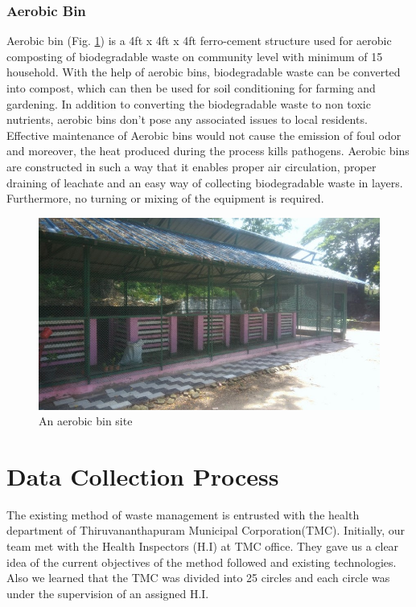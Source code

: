 \documentclass[12pt,a4paper]{report}
\begin{document}
\subsection{Aerobic Bin}
Aerobic bin (Fig. \ref{fig:aerobins}) is a 4ft x 4ft x 4ft ferro-cement structure used for aerobic composting of biodegradable waste on community level with minimum of 15 household. With the help of aerobic bins, biodegradable waste can be converted into compost, which can then be used for soil conditioning for farming and gardening. In addition to converting the biodegradable waste to non toxic nutrients, aerobic bins don’t pose any associated issues to local residents. Effective maintenance of Aerobic bins would not cause the emission of foul odor and moreover, the heat produced during the process kills pathogens. Aerobic bins are constructed in such a way that it enables proper air circulation, proper draining of leachate and an easy way of collecting biodegradable waste in layers. Furthermore, no turning or mixing of the equipment is required.

\begin{figure}[H]
	\centering
	\includegraphics[width=1\linewidth]{aerobins}
	\caption{An aerobic bin site}
	\label{fig:aerobins}
\end{figure}

\chapter{\textbf{Data Collection Process}}
The existing method of waste management is entrusted with the health department of Thiruvananthapuram Municipal Corporation(TMC). Initially, our team met with the Health Inspectors (H.I) at TMC office. They gave us a clear idea of the current objectives of the method followed and existing technologies. Also we learned that the TMC was divided into 25 circles and each circle was under the supervision of an assigned H.I.
\end{document}
